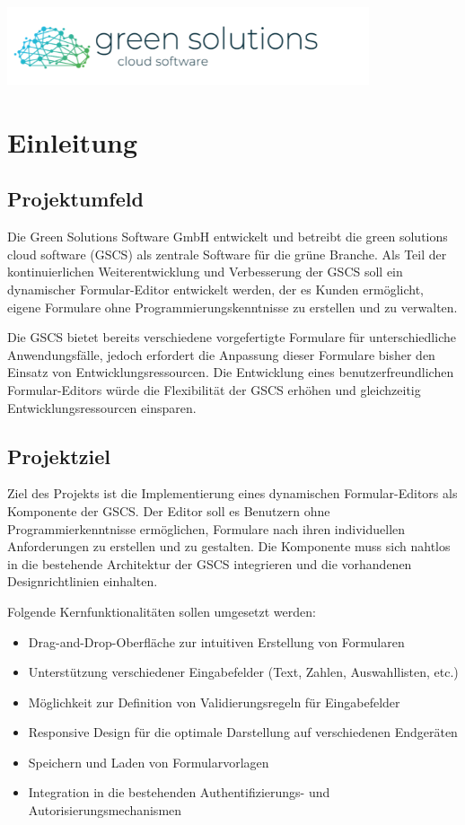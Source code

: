 \documentclass[a4paper,11pt]{article}
\begin{document}
\begin{titlepage}
\begin{center}
\includegraphics[width=0.8\textwidth]{green_solutions_logo}
\end{center}
\end{titlepage}


\tableofcontents
\newpage

\section{Einleitung}
\subsection{Projektumfeld}
Die Green Solutions Software GmbH entwickelt und betreibt die green solutions cloud software (GSCS) als zentrale Software für die grüne Branche. Als Teil der kontinuierlichen Weiterentwicklung und Verbesserung der GSCS soll ein dynamischer Formular-Editor entwickelt werden, der es Kunden ermöglicht, eigene Formulare ohne Programmierungskenntnisse zu erstellen und zu verwalten.

Die GSCS bietet bereits verschiedene vorgefertigte Formulare für unterschiedliche Anwendungsfälle, jedoch erfordert die Anpassung dieser Formulare bisher den Einsatz von Entwicklungsressourcen. Die Entwicklung eines benutzerfreundlichen Formular-Editors würde die Flexibilität der GSCS erhöhen und gleichzeitig Entwicklungsressourcen einsparen.

\subsection{Projektziel}
Ziel des Projekts ist die Implementierung eines dynamischen Formular-Editors als Komponente der GSCS. Der Editor soll es Benutzern ohne Programmierkenntnisse ermöglichen, Formulare nach ihren individuellen Anforderungen zu erstellen und zu gestalten. Die Komponente muss sich nahtlos in die bestehende Architektur der GSCS integrieren und die vorhandenen Designrichtlinien einhalten.

Folgende Kernfunktionalitäten sollen umgesetzt werden:
\begin{itemize}
  \item Drag-and-Drop-Oberfläche zur intuitiven Erstellung von Formularen
  \item Unterstützung verschiedener Eingabefelder (Text, Zahlen, Auswahllisten, etc.)
  \item Möglichkeit zur Definition von Validierungsregeln für Eingabefelder
  \item Responsive Design für die optimale Darstellung auf verschiedenen Endgeräten
  \item Speichern und Laden von Formularvorlagen
  \item Integration in die bestehenden Authentifizierungs- und Autorisierungsmechanismen
\end{itemize}
\end{document}
